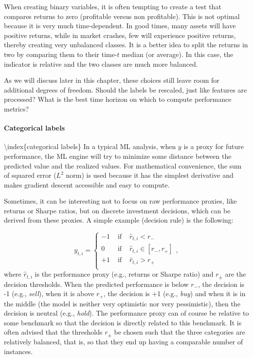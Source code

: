 When creating binary variables, it is often tempting to create a test that compares returns to zero (profitable versus non profitable). This is not optimal because it is very much time-dependent. In good times, many assets will have positive returns, while in market crashes, few will experience positive returns, thereby creating very unbalanced classes. It is a better idea to split the returns in two by comparing them to their time-$t$ median (or average). In this case, the indicator is relative and the two classes are much more balanced.

As we will discuss later in this chapter, these choices still leave room for additional degrees of freedom. Should the labels be rescaled, just like features are processed? What is the best time horizon on which to compute performance metrics?

\paragraph{Categorical labels}

{\textbackslash}index\{categorical labels\}
In a typical ML analysis, when $y$ is a proxy for future performance, the ML engine will try to minimize some distance between the predicted value and the realized values. For mathematical convenience, the sum of squared error ($L^2$ norm) is used because it has the simplest derivative and makes gradient descent accessible and easy to compute.

Sometimes, it can be interesting not to focus on raw performance proxies, like returns or Sharpe ratios, but on discrete investment decisions, which can be derived from these proxies. A simple example (decision rule) is the following:

\begin{equation}
\label{catlabel}
y_{t,i}=\left\{  \begin{array}{rll}
-1 & \text{ if } & \hat{r}_{t,i} < r_- \\
0 & \text{ if } & \hat{r}_{t,i} \in [r_-,r_+] \\
+1 & \text{ if } & \hat{r}_{t,i} > r_+ \\
\end{array} \right.,
\end{equation}
where $\hat{r}_{t,i}$ is the performance proxy (e.g., returns or Sharpe ratio) and $r_\pm$ are the decision thresholds. When the predicted performance is below $r_ -$, the decision is -1 (e.g., \textit{sell}), when it is above $r_+$, the decision is +1 (e.g., \textit{buy}) and when it is in the middle (the model is neither very optimistic nor very pessimistic), then the decision is neutral (e.g., \textit{hold}). The performance proxy can of course be relative to some benchmark so that the decision is directly related to this benchmark. It is often advised that the thresholds $r_\pm$ be chosen such that the three categories are relatively balanced, that is, so that they end up having a comparable number of instances.

